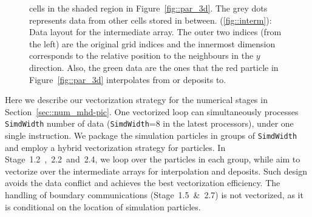 \documentclass[fleqn,usenatbib]{mnras}
\begin{document}
\begin{figure}
{    cells in the shaded region in Figure~\ref{fig::par_3d}. The grey dots represents data from other cells stored in between. (\ref{fig::interm}): Data layout for the intermediate array. The outer two indices (from the left) are the original grid indices and the innermost dimension corresponds to the relative position to the neighbours in the $y$ direction. Also, the green data are the ones that the red particle in Figure~\ref{fig::par_3d} interpolates from or deposits to.}
\end{figure}



Here we describe our vectorization strategy for the numerical stages in Section~\ref{sec::num_mhd-pic}. One vectorized loop can simultaneously processes \texttt{SimdWidth} number of data
(\texttt{SimdWidth}=8 in the latest processors), under one single instruction.
We package the simulation particles in groups of \texttt{SimdWidth}
and employ a hybrid vectorization strategy for particles.
In Stage~1.2~,~2.2~and~2.4, we loop over the particles in each group, while aim to vectorize over the intermediate arrays for interpolation and deposits.
Such design avoids the data conflict and achieves the best vectorization efficiency. The handling of boundary communications (Stage~1.5~\&~2.7) is not vectorized, as it is conditional on the location of simulation particles.

\begin{algorithm}[!ht] 
	\caption{Mapping relations for the intermediate array}
 	\label{alg::mapping}
\DontPrintSemicolon

\end{algorithm}
\end{document}
